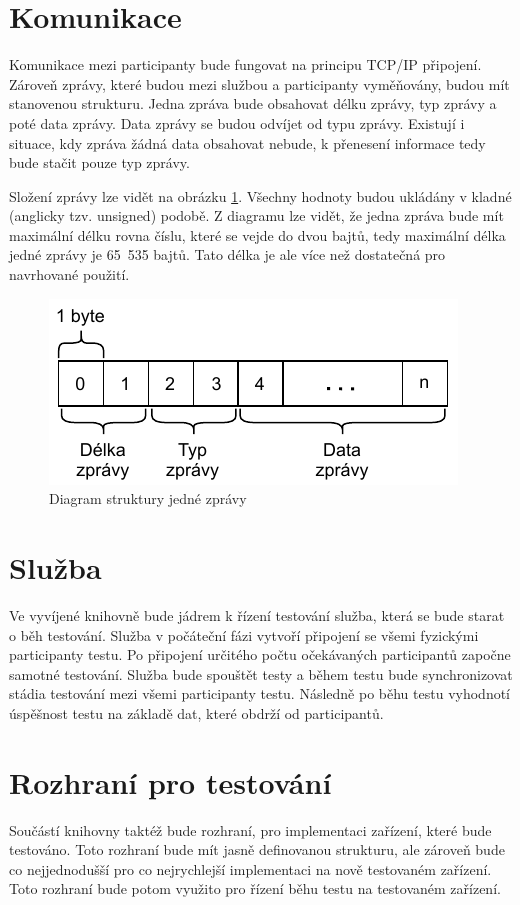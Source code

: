 \section{Komunikace}
Komunikace mezi participanty bude fungovat na principu TCP/IP připojení. Zároveň zprávy, které budou mezi službou a participanty vyměňovány, budou mít stanovenou strukturu. Jedna zpráva bude obsahovat délku zprávy, typ zprávy a poté data zprávy. Data zprávy se budou odvíjet od typu zprávy. Existují i situace, kdy zpráva žádná data obsahovat nebude, k přenesení informace tedy bude stačit pouze typ zprávy. 

Složení zprávy lze vidět na obrázku \ref{fig:message}. Všechny hodnoty budou ukládány v kladné (anglicky tzv. unsigned) podobě. Z diagramu lze vidět, že jedna zpráva bude mít maximální délku rovna číslu, které se vejde do dvou bajtů, tedy maximální délka jedné zprávy je 65~535 bajtů. Tato délka je ale více než dostatečná pro navrhované použití.  

\begin{figure}[htbp]
    \centering 
    \includegraphics{assets/img/message.pdf}
    \caption{Diagram struktury jedné zprávy}
    \label{fig:message}
\end{figure}


\section{Služba}
Ve vyvíjené knihovně bude jádrem k řízení testování služba, která se bude starat o běh testování. Služba v počáteční fázi vytvoří připojení se všemi fyzickými participanty testu. Po připojení určitého počtu očekávaných participantů započne samotné testování. Služba bude spouštět testy a během testu bude synchronizovat stádia testování mezi všemi participanty testu. Následně po běhu testu vyhodnotí úspěšnost testu na základě dat, které obdrží od participantů. 


\section{Rozhraní pro testování}
Součástí knihovny taktéž bude rozhraní, pro implementaci zařízení, které bude testováno. Toto rozhraní bude mít jasně definovanou  strukturu, ale zároveň bude co nejjednodušší pro co nejrychlejší implementaci na nově testovaném zařízení. Toto rozhraní bude potom využito pro řízení běhu testu na testovaném zařízení. 

